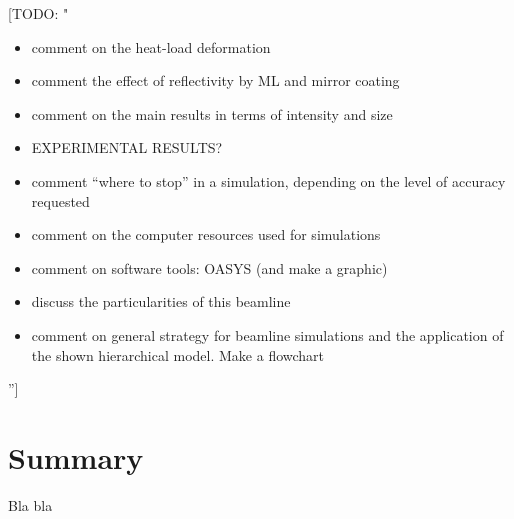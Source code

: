 \documentclass{iucr}              %
\newcommand{\todo}[1]{{\color{red}[TODO: "#1'']}}
\begin{document}
\todo{
\begin{itemize}
 \item comment on the heat-load deformation 
 \item comment the effect of reflectivity by ML and mirror coating
 \item comment on the main results in terms of intensity and size
 \item EXPERIMENTAL RESULTS?
 \item comment ``where to stop'' in a simulation, depending on the level of accuracy requested
 \item comment on the computer resources used for simulations
 \item comment on software tools: OASYS (and make a graphic)
 \item discuss the particularities of this beamline 
 \item comment on general strategy for beamline simulations and the application of the shown hierarchical model. Make a flowchart
\end{itemize}
}

\section{Summary}

Bla bla



\end{document}

